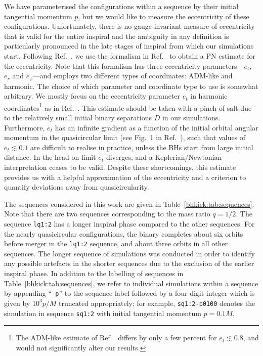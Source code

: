 We have parameterised the configurations within a sequence by their
initial tangential momentum $p$, but we would like to measure the
eccentricity of these configurations. Unfortunately, there is no
gauge-invariant measure of eccentricity~\cite{Loutrel:2018ydu}
that is valid for the entire inspiral and the
ambiguity in any definition is particularly pronounced in the late
stages of inspiral from which our simulations start. Following
Ref.~\cite{Sperhake:2007gu}, we use the formalism in
Ref.~\cite{Memmesheimer:2004cv} to obtain a PN estimate for the
eccentricity. Note that this formalism has three eccentricity
parameters---$e_t$, $e_r$ and $e_\phi$---and employs two
different types of coordinates: ADM-like and harmonic. The choice of
which parameter and coordinate type to use is somewhat arbitrary.
We mostly focus on the eccentricity parameter $e_t$ in harmonic coordinates\footnote{
The ADM-like estimate of Ref.~\cite{Memmesheimer:2004cv} differs
by only a few percent for $e_t \lesssim 0.8$, and
would not significantly alter our results.}
as in Ref.~\cite{Sperhake:2019wwo}. This estimate should be
taken with a pinch of salt due to the relatively small initial binary
separations $D$ in our simulations. Furthermore, $e_t$ has an infinite
gradient as a function of the initial orbital angular momentum
in the quasicircular limit (see Fig.~1 in Ref.~\cite{Sperhake:2007gu}),
such that values of $e_t\lesssim0.1$ are difficult to realise in practice,
unless the BHs start from large initial distance.
In the head-on limit $e_t$ diverges, and a Keplerian/Newtonian
interpretation ceases to be valid. Despite these shortcomings, this
estimate provides us with a helpful approximation of the eccentricity
and a criterion to quantify deviations away from quasicircularity.

The sequences considered in this work are given in
Table~\ref{bhkick:tab:sequences}.  Note that there are two sequences
corresponding to the mass ratio $q=1/2$.  The sequence \texttt{lq1:2}
has a longer inspiral phase compared to the other sequences. For the
nearly quasicircular configurations, the binary completes about six
orbits before merger in the \texttt{lq1:2} sequence, and about three
orbits in all other sequences. The longer sequence of simulations was
conducted in order to identify any possible artefacts in the shorter
sequences due to the exclusion of the earlier inspiral phase. In
addition to the labelling of sequences in Table~\ref{bhkick:tab:sequences},
we refer to individual simulations within a sequence by appending
``\texttt{-p}'' to the sequence label followed by a four digit integer
which is given by $10^3p/M$ truncated appropriately; for example,
\texttt{sq1:2-p0100} denotes the simulation in sequence
\texttt{sq1:2} with initial tangential momentum $p = 0.1M$.




